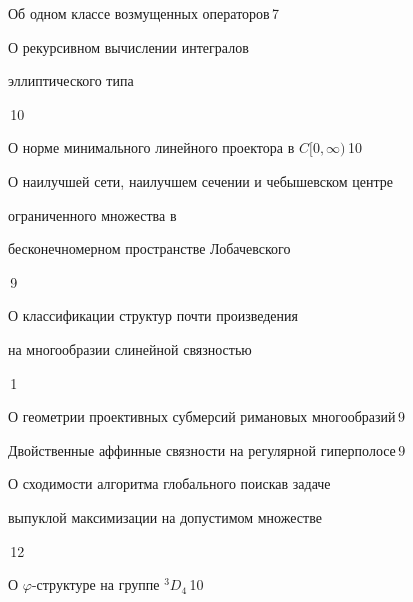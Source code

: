 {Об одном классе возмущенных операторов}{\No\,7}






{О рекурсивном вычислении интегралов 


эллиптического типа}{\No\,10}






{О норме минимального линейного проектора в $C[0,\infty)$}{\No\,10}






{О наилучшей сети, наилучшем сечении и чебышевском центре\newline


ограниченного множества в


бесконечномерном пространстве Лобачевского}{\No\,9}




{О классификации структур почти произведения 


на многообразии с\newline линейной связностью}{\No\,1}




{О геометрии проективных субмерсий римановых многообразий}{\No\,9}




{Двойственные аффинные связности на регулярной гиперполосе}{\No\,9}




{О сходимости алгоритма глобального поиска\newline в задаче


выпуклой максимизации на допустимом множестве}{\No\,12}




{О $\varphi$-структуре на группе $^3D_4$}{\No\,10}


